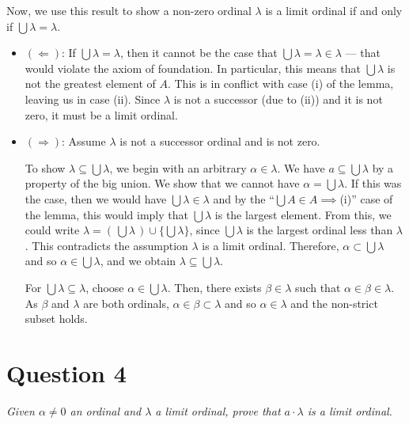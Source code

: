 \documentclass[a4paper]{article}
\begin{document}
Now, we use this result to show a non-zero ordinal $\lambda$ is a limit ordinal
if and only if $\bigcup \lambda = \lambda$.
\begin{itemize}
  \item $(\Longleftarrow)$:
    If $\bigcup \lambda = \lambda$, then it cannot be the case that $\bigcup \lambda = \lambda \in \lambda$ --- that would violate the axiom of foundation.
    In particular, this means that $\bigcup \lambda$ is not the greatest element of $A$.
    This
    is in conflict with case (i) of the lemma,
    leaving us in case (ii).
    Since $\lambda$ 
    is not a successor (due to (ii)) and it is not zero,
    it must be a limit ordinal.
  \item $(\Longrightarrow)$:
    Assume $\lambda$ is not a successor ordinal and is not zero.

    To show $\lambda \subseteq \bigcup \lambda$,
    we begin with an arbitrary $\alpha \in \lambda$.
    We have $a \subseteq \bigcup \lambda$
    by a property of the big union.
    We show that we cannot have $\alpha =  \bigcup \lambda$. 
    If this was the case, then we would have $\bigcup \lambda \in \lambda$
    and by the ``$\bigcup A \in A \implies $(i)'' case of the lemma,
    this would imply that $\bigcup \lambda$ is the largest element.
    From this, we could write
    $\lambda = (\,\bigcup \lambda\,) \cup \{\bigcup \lambda\}$,
    since $\bigcup \lambda$ is the largest ordinal less than $\lambda$.
    This contradicts the assumption $\lambda$ is a limit ordinal.
    Therefore, $\alpha \subset \bigcup \lambda$ and so $\alpha \in \bigcup \lambda$, and
    we obtain $\lambda \subseteq \bigcup \lambda$.

    For $\bigcup \lambda \subseteq \lambda$,
    choose $\alpha \in \bigcup \lambda$.
    Then, there exists $\beta \in \lambda$ such that $\alpha \in \beta \in \lambda$.
    As $\beta$ and $\lambda$ are both ordinals,
    $\alpha \in \beta \subset \lambda$ and so $\alpha \in \lambda$
    and the non-strict subset holds.








\end{itemize}



\section*{Question 4}
\begin{center}
  \textit{Given $\alpha \ne 0$ an ordinal and $\lambda$ a limit ordinal,
  prove that $a \cdot \lambda$ is a limit ordinal.}
\end{center}
\end{document}
